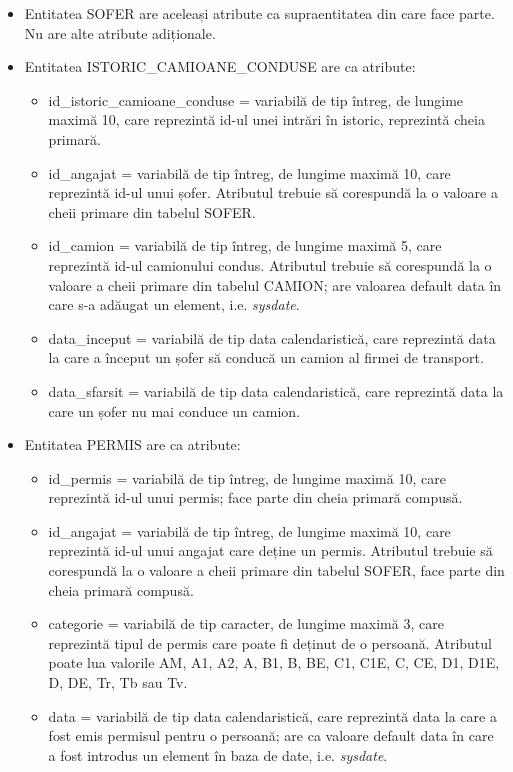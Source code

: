 \documentclass[12pt, a4paper]{article}
\begin{document}
\begin{itemize}
    \item Entitatea SOFER are aceleași atribute ca supraentitatea din care face parte. Nu are alte atribute adiționale.
    \item Entitatea ISTORIC\_CAMIOANE\_CONDUSE are ca atribute:
        \begin{itemize}
            \item id\_istoric\_camioane\_conduse = variabilă de tip întreg, de lungime maximă 10, care reprezintă id-ul unei intrări în istoric, reprezintă cheia primară.
            \item id\_angajat = variabilă de tip întreg, de lungime maximă 10, care reprezintă id-ul unui șofer. Atributul trebuie să corespundă la o valoare a cheii primare din tabelul SOFER.
            \item id\_camion = variabilă de tip întreg, de lungime maximă 5, care reprezintă id-ul camionului condus. Atributul trebuie să corespundă la o valoare a cheii primare din tabelul CAMION; are valoarea default data în care s-a adăugat un element, i.e. \emph{sysdate}.
            \item data\_inceput = variabilă de tip data calendaristică, care reprezintă data la care a început un șofer să conducă un camion al firmei de transport.
            \item data\_sfarsit = variabilă de tip data calendaristică, care reprezintă data la care un șofer nu mai conduce un camion.
        \end{itemize}
    \item Entitatea PERMIS are ca atribute:
        \begin{itemize}
            \item id\_permis = variabilă de tip întreg, de lungime maximă 10, care reprezintă id-ul unui permis; face parte din cheia primară compusă.
            \item id\_angajat = variabilă de tip întreg, de lungime maximă 10, care reprezintă id-ul unui angajat care deține un permis. Atributul trebuie să corespundă la o valoare a cheii primare din tabelul SOFER, face parte din cheia primară compusă.
            \item categorie = variabilă de tip caracter, de lungime maximă 3, care reprezintă tipul de permis care poate fi deținut de o persoană. Atributul poate lua valorile AM, A1, A2, A, B1, B, BE, C1, C1E, C, CE, D1, D1E, D, DE, Tr, Tb sau Tv.
            \item data = variabilă de tip data calendaristică, care reprezintă data la care a fost emis permisul pentru o persoană; are ca valoare default data în care a fost introdus un element în baza de date, i.e. \emph{sysdate}.

\end{itemize}
\end{itemize}
\end{document}
